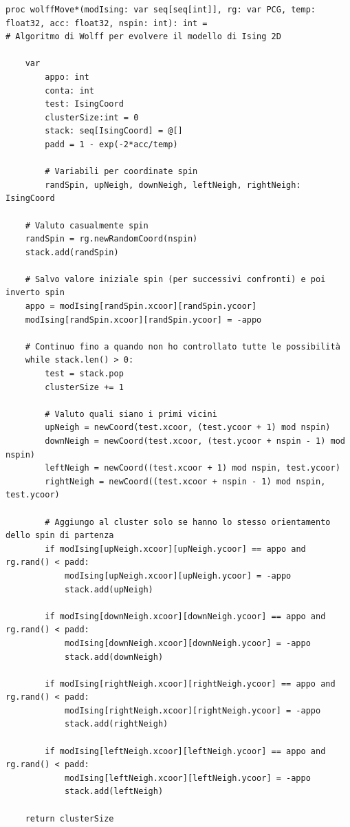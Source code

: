 \begin{verbatim}
proc wolffMove*(modIsing: var seq[seq[int]], rg: var PCG, temp: float32, acc: float32, nspin: int): int = 
# Algoritmo di Wolff per evolvere il modello di Ising 2D

    var 
        appo: int
        conta: int
        test: IsingCoord
        clusterSize:int = 0
        stack: seq[IsingCoord] = @[]
        padd = 1 - exp(-2*acc/temp)

        # Variabili per coordinate spin
        randSpin, upNeigh, downNeigh, leftNeigh, rightNeigh: IsingCoord

    # Valuto casualmente spin
    randSpin = rg.newRandomCoord(nspin)
    stack.add(randSpin)

    # Salvo valore iniziale spin (per successivi confronti) e poi inverto spin
    appo = modIsing[randSpin.xcoor][randSpin.ycoor]
    modIsing[randSpin.xcoor][randSpin.ycoor] = -appo

    # Continuo fino a quando non ho controllato tutte le possibilità
    while stack.len() > 0:
        test = stack.pop
        clusterSize += 1

        # Valuto quali siano i primi vicini
        upNeigh = newCoord(test.xcoor, (test.ycoor + 1) mod nspin)
        downNeigh = newCoord(test.xcoor, (test.ycoor + nspin - 1) mod nspin)
        leftNeigh = newCoord((test.xcoor + 1) mod nspin, test.ycoor)
        rightNeigh = newCoord((test.xcoor + nspin - 1) mod nspin, test.ycoor)

        # Aggiungo al cluster solo se hanno lo stesso orientamento dello spin di partenza
        if modIsing[upNeigh.xcoor][upNeigh.ycoor] == appo and rg.rand() < padd:
            modIsing[upNeigh.xcoor][upNeigh.ycoor] = -appo
            stack.add(upNeigh)

        if modIsing[downNeigh.xcoor][downNeigh.ycoor] == appo and rg.rand() < padd:
            modIsing[downNeigh.xcoor][downNeigh.ycoor] = -appo
            stack.add(downNeigh)

        if modIsing[rightNeigh.xcoor][rightNeigh.ycoor] == appo and rg.rand() < padd:
            modIsing[rightNeigh.xcoor][rightNeigh.ycoor] = -appo
            stack.add(rightNeigh)

        if modIsing[leftNeigh.xcoor][leftNeigh.ycoor] == appo and rg.rand() < padd:
            modIsing[leftNeigh.xcoor][leftNeigh.ycoor] = -appo
            stack.add(leftNeigh)
    
    return clusterSize
\end{verbatim}    
    